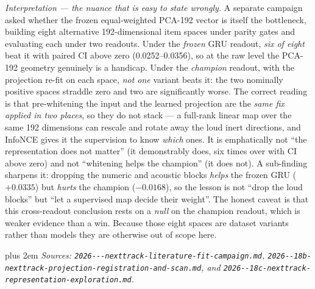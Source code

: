 \documentclass[11pt]{article}
\begin{document}
\emph{Interpretation --- the nuance that is easy to state wrongly.} A separate
campaign asked whether the frozen equal-weighted PCA-192 vector is itself the
bottleneck, building eight alternative \num{192}-dimensional item spaces under
parity gates and evaluating each under two readouts. Under the \emph{frozen} GRU
readout, \emph{six of eight} beat it with paired CI above zero
(\numrange{+0.0252}{+0.0356}), so at the raw level the PCA-192 geometry
genuinely is a handicap. Under the \emph{champion} readout, with the projection
re-fit on each space, \emph{not one} variant beats it: the two nominally
positive spaces straddle zero and two are significantly worse. The correct
reading is that pre-whitening the input and the learned projection are the
\emph{same fix applied in two places}, so they do not stack --- a full-rank
linear map over the same \num{192} dimensions can rescale and rotate away the
loud inert directions, and InfoNCE gives it the supervision to know \emph{which}
ones. It is emphatically not ``the representation does not matter'' (it
demonstrably does, six times over with CI above zero) and not ``whitening helps
the champion'' (it does not). A sub-finding sharpens it: dropping the numeric and
acoustic blocks \emph{helps} the frozen GRU ($+\num{0.0335}$) but \emph{hurts}
the champion ($-\num{0.0168}$), so the lesson is not ``drop the loud blocks'' but
``let a supervised map decide their weight''. The honest caveat is that this
cross-readout conclusion rests on a \emph{null} on the champion readout, which
is weaker evidence than a win. Because those eight spaces are dataset variants
rather than models they are otherwise out of scope here.

{\rightskip=0pt plus 2em \emph{Sources: \texttt{2026---\allowbreak nexttrack-\allowbreak literature-\allowbreak fit-\allowbreak campaign.md},
\texttt{2026--\allowbreak 18b-\allowbreak nexttrack-\allowbreak projection-\allowbreak registration-\allowbreak and-\allowbreak scan.md},
and \texttt{2026--\allowbreak 18c-\allowbreak nexttrack-\allowbreak representation-\allowbreak exploration.md}.}\par}
\end{document}
